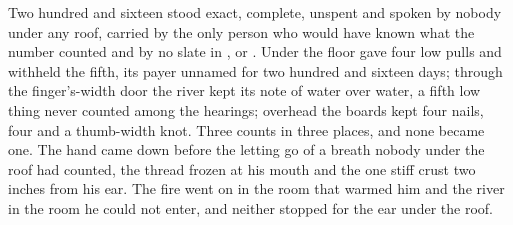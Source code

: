 Two hundred and sixteen stood exact, complete, unspent and spoken by nobody under any roof, carried by the only person who would have known what the number counted and by no slate in ,  or . Under the floor  gave four low pulls and withheld the fifth, its payer unnamed for two hundred and sixteen days; through the finger's-width door the river kept its note of water over water, a fifth low thing never counted among the hearings; overhead the boards kept four nails, four and a thumb-width knot. Three counts in three places, and none became one. The hand came down before the letting go of a breath nobody under the roof had counted, the thread frozen at his mouth and the one stiff crust two inches from his ear. The fire went on in the room that warmed him and the river in the room he could not enter, and neither stopped for the ear under the roof.
